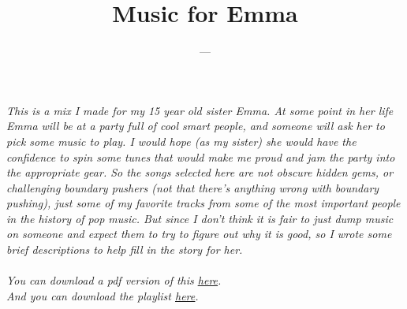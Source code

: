 \documentclass[letterpaper,single]{article}
\title{Music for Emma}
\date{}
\author{---}
\begin{document}
 
\maketitle
\itshape
This is a mix I made for my 15 year old sister Emma.
At some point in her life Emma will be at a party full of cool smart people, and someone will ask her to pick some music to play. I would hope (as my sister) she would have the confidence to spin some tunes that would make me proud and jam the party into the appropriate gear.
So the songs selected here are not obscure hidden gems, or challenging boundary pushers (not that there's anything wrong with boundary pushing), just some of my favorite tracks from some of the most important people in the history of pop music.
But since I don't think it is fair to just dump music on someone and expect them to try to figure out why it is good, so I wrote some brief descriptions to help fill in the story for her.\\
\\
You can download a pdf version of this \href{http://dynohub.net/musicforemma/texfiles/MusicforEmma.pdf}{\underline{here}}.\\
And you can download the playlist \href{http://dynohub.net/musicforemma/musicforemma-tracks.zip}{\underline{here}}.\\
\upshape
\end{document}
